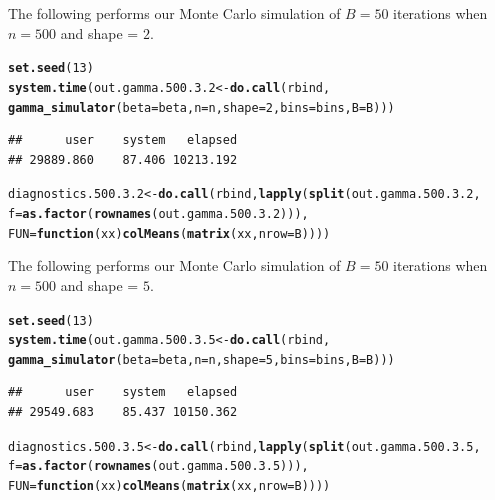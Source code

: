 \documentclass[11pt]{article}\usepackage[]{graphicx}\usepackage[]{color}
\makeatletter
\newcommand{\hlnum}[1]{\textcolor[rgb]{0.686,0.059,0.569}{#1}}%
\newcommand{\hlstd}[1]{\textcolor[rgb]{0.345,0.345,0.345}{#1}}%
\newcommand{\hlkwa}[1]{\textcolor[rgb]{0.161,0.373,0.58}{\textbf{#1}}}%
\newcommand{\hlkwb}[1]{\textcolor[rgb]{0.69,0.353,0.396}{#1}}%
\newcommand{\hlkwc}[1]{\textcolor[rgb]{0.333,0.667,0.333}{#1}}%
\newcommand{\hlkwd}[1]{\textcolor[rgb]{0.737,0.353,0.396}{\textbf{#1}}}%
\newenvironment{kframe}{%
 \def\at@end@of@kframe{}%
 \ifinner\ifhmode%
  \def\at@end@of@kframe{\end{minipage}}%
  \begin{minipage}{\columnwidth}%
 \fi\fi%
 \def\FrameCommand##1{\hskip\@totalleftmargin \hskip-\fboxsep
 \colorbox{shadecolor}{##1}\hskip-\fboxsep
     \hskip-\linewidth \hskip-\@totalleftmargin \hskip\columnwidth}%
 \MakeFramed {\advance\hsize-\width
   \@totalleftmargin\z@ \linewidth\hsize
   \@setminipage}}%
 {\par\unskip\endMakeFramed%
 \at@end@of@kframe}
\newenvironment{knitrout}{}{} %
\makeatother
\begin{document}
The following performs our Monte Carlo simulation of $B = 50$ iterations 
when $n = 500$ and shape = $2$.

\begin{knitrout}
\color{fgcolor}\begin{kframe}
\begin{alltt}
\hlkwd{set.seed}\hlstd{(}\hlnum{13}\hlstd{)}
\hlkwd{system.time}\hlstd{(out.gamma.500.3.2} \hlkwb{<-} \hlkwd{do.call}\hlstd{(rbind,}
  \hlkwd{gamma_simulator}\hlstd{(}\hlkwc{beta} \hlstd{= beta,} \hlkwc{n} \hlstd{= n,} \hlkwc{shape} \hlstd{=} \hlnum{2}\hlstd{,} \hlkwc{bins} \hlstd{= bins,} \hlkwc{B} \hlstd{= B)))}
\end{alltt}
\begin{verbatim}
##      user    system   elapsed 
## 29889.860    87.406 10213.192
\end{verbatim}
\begin{alltt}
\hlstd{diagnostics.500.3.2} \hlkwb{<-} \hlkwd{do.call}\hlstd{(rbind,} \hlkwd{lapply}\hlstd{(}\hlkwd{split}\hlstd{(out.gamma.500.3.2,}
  \hlkwc{f} \hlstd{=} \hlkwd{as.factor}\hlstd{(}\hlkwd{rownames}\hlstd{(out.gamma.500.3.2))),}
  \hlkwc{FUN} \hlstd{=} \hlkwa{function}\hlstd{(}\hlkwc{xx}\hlstd{)} \hlkwd{colMeans}\hlstd{(}\hlkwd{matrix}\hlstd{(xx,} \hlkwc{nrow} \hlstd{= B))))}
\end{alltt}
\end{kframe}
\end{knitrout}


The following performs our Monte Carlo simulation of $B = 50$ iterations 
when $n = 500$ and shape = $5$.

\begin{knitrout}
\color{fgcolor}\begin{kframe}
\begin{alltt}
\hlkwd{set.seed}\hlstd{(}\hlnum{13}\hlstd{)}
\hlkwd{system.time}\hlstd{(out.gamma.500.3.5} \hlkwb{<-} \hlkwd{do.call}\hlstd{(rbind,}
  \hlkwd{gamma_simulator}\hlstd{(}\hlkwc{beta} \hlstd{= beta,} \hlkwc{n} \hlstd{= n,} \hlkwc{shape} \hlstd{=} \hlnum{5}\hlstd{,} \hlkwc{bins} \hlstd{= bins,} \hlkwc{B} \hlstd{= B)))}
\end{alltt}
\begin{verbatim}
##      user    system   elapsed 
## 29549.683    85.437 10150.362
\end{verbatim}
\begin{alltt}
\hlstd{diagnostics.500.3.5} \hlkwb{<-} \hlkwd{do.call}\hlstd{(rbind,} \hlkwd{lapply}\hlstd{(}\hlkwd{split}\hlstd{(out.gamma.500.3.5,}
  \hlkwc{f} \hlstd{=} \hlkwd{as.factor}\hlstd{(}\hlkwd{rownames}\hlstd{(out.gamma.500.3.5))),}
  \hlkwc{FUN} \hlstd{=} \hlkwa{function}\hlstd{(}\hlkwc{xx}\hlstd{)} \hlkwd{colMeans}\hlstd{(}\hlkwd{matrix}\hlstd{(xx,} \hlkwc{nrow} \hlstd{= B))))}
\end{alltt}
\end{kframe}
\end{knitrout}
\end{document}
